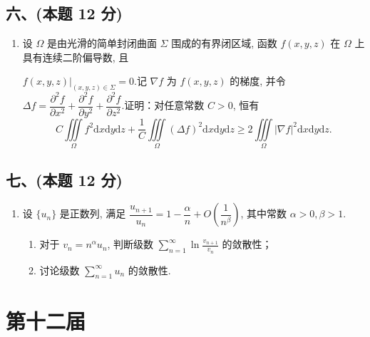\subsection*{六、(本题 12 分)}
\begin{enumerate}[start=10]
    \item 设 $\Omega$ 是由光滑的简单封闭曲面 $\Sigma$ 围成的有界闭区域, 函数 $f(x, y, z)$ 在 $\Omega$ 上具有连续二阶偏导数, 且

          $f(x, y, z)|_{(x, y, z) \in \Sigma} = 0$.记 $\nabla f$ 为 $f(x, y, z)$ 的梯度, 并令 $\Delta f = \dfrac{\partial^2 f}{\partial x^2} + \dfrac{\partial^2 f}{\partial y^2} + \dfrac{\partial^2 f}{\partial z^2}$.证明：对任意常数 $C > 0$, 恒有
          \[
              C \iiint\limits_{\Omega} f^2 \mathrm{d}x \mathrm{d}y \mathrm{d}z + \frac{1}{C} \iiint\limits_{\Omega} (\Delta f)^2 \mathrm{d}x \mathrm{d}y \mathrm{d}z \geqslant 2 \iiint\limits_{\Omega} |\nabla f|^2 \mathrm{d}x \mathrm{d}y \mathrm{d}z.
          \]
\end{enumerate}

\subsection*{七、(本题 12 分)}
\begin{enumerate}[start=11]
    \item 设 $\{u_n\}$ 是正数列, 满足 $\dfrac{u_{n+1}}{u_n} = 1 - \dfrac{\alpha}{n} + O\left(\dfrac{1}{n^\beta}\right)$, 其中常数 $\alpha > 0, \beta > 1$.
          \begin{enumerate}
              \item[(1)] 对于 $v_n = n^\alpha u_n$, 判断级数 $\displaystyle\sum_{n=1}^{\infty} \ln \frac{v_{n+1}}{v_n}$ 的敛散性；
              \item[(2)] 讨论级数 $\displaystyle\sum_{n=1}^{\infty} u_n$ 的敛散性.
          \end{enumerate}
\end{enumerate}


\newpage
\section{第十二届}

